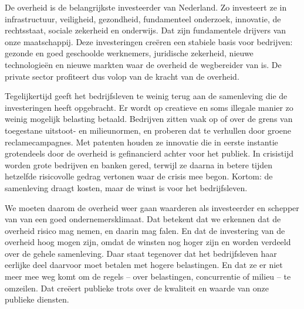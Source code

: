 
De overheid is de belangrijkste investeerder van Nederland. Zo investeert ze in infrastructuur, veiligheid, gezondheid, fundamenteel onderzoek, innovatie, de rechtsstaat, sociale zekerheid en onderwijs. Dat zijn fundamentele drijvers van onze maatschappij. Deze investeringen creëren een stabiele basis voor bedrijven: gezonde en goed geschoolde werknemers, juridische zekerheid, nieuwe technologieën en nieuwe markten waar de overheid de wegbereider van is. De private sector profiteert dus volop van de kracht van de overheid.

Tegelijkertijd geeft het bedrijfsleven te weinig terug aan de samenleving die de investeringen heeft opgebracht. Er wordt op creatieve en soms illegale manier zo weinig mogelijk belasting betaald. Bedrijven zitten vaak op of over de grens van toegestane uitstoot- en milieunormen, en proberen dat te verhullen door groene reclamecampagnes. Met patenten houden ze innovatie die in eerste instantie grotendeels door de overheid is gefinancierd achter voor het publiek. In crisistijd worden grote bedrijven en banken gered, terwijl ze daarna in betere tijden hetzelfde risicovolle gedrag vertonen waar de crisis mee begon. Kortom: de samenleving draagt kosten, maar de winst is voor het bedrijfsleven.

We moeten daarom de overheid weer gaan waarderen als investeerder en schepper van van een goed ondernemersklimaat. Dat betekent dat we erkennen dat de overheid risico mag nemen, en daarin mag falen. En dat de investering van de overheid hoog mogen zijn, omdat de winsten nog hoger zijn en worden verdeeld over de gehele samenleving. Daar staat tegenover dat het bedrijfsleven haar eerlijke deel daarvoor moet betalen met hogere belastingen. En dat ze er niet meer mee weg komt om de regels – over belastingen, concurrentie of milieu – te omzeilen. Dat creëert publieke trots over de kwaliteit en waarde van onze publieke diensten.
